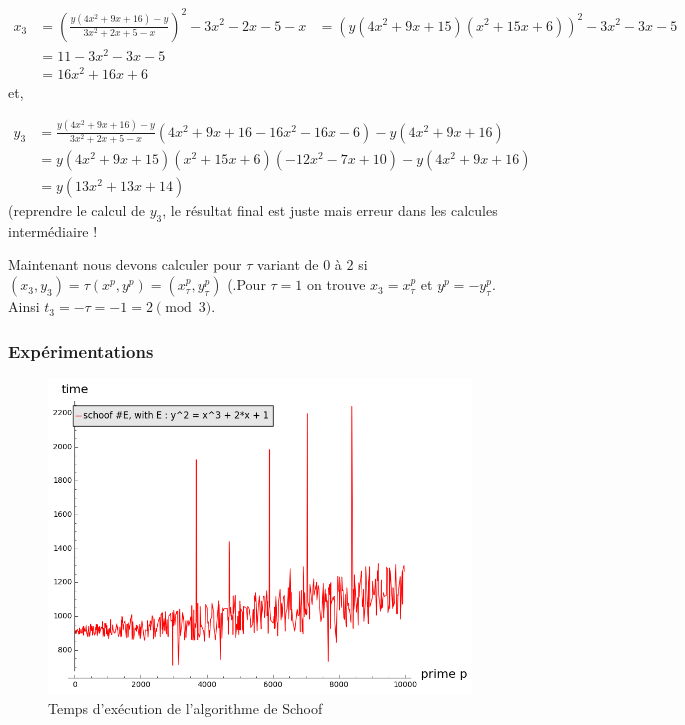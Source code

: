 \documentclass{article}
\begin{document}
\begin{align*}
x_3 &= (\frac{y(4x^2+9x+16) - y}{3x^2 +2x +5 - x})^2 -3x^2 -2x - 5 - x 
 	&= (y(4x^2+9x+15)(x^2+15x+6))^2 -3x^2 -3x - 5 \\
 	&= 11 - 3x^2 -3x - 5  \\
 	&= 16x^2 + 16x + 6 
\end{align*}
et, 

\begin{align*}
y_3 &= \frac{y(4x^2+9x+16) - y}{3x^2 +2x +5 - x} (4x^2+9x+16 -  16x^2 - 16x - 6) - y(4x^2+9x+16) \\
	&= y(4x^2+9x+15)(x^2+15x+6)( -12x^2 - 7x +10 ) - y(4x^2+9x+16)\\
	&= y(13x^2 + 13x + 14)
\end{align*}
(reprendre le calcul de $y_3$, le résultat final est juste mais erreur dans les calcules intermédiaire !

Maintenant nous devons calculer pour $\tau$ variant de $0$ à $2$ si $(x_3, y_3) = \tau (x^p, y^p)=(x_{\tau}^p, y_{\tau}^p)$  (.Pour $\tau = 1$ on trouve $x_3 = x_{\tau}^p$ et $y^p= - y_{\tau}^p$. Ainsi $t_3 = -\tau = -1 = 2 \pmod 3$. 

\newpage
\subsubsection{Expérimentations}


\begin{figure}[h!]
\includegraphics[scale=0.6]{pictures/schoof_cputime.png} 
\caption{Temps d'exécution de l'algorithme de Schoof}
\end{figure}
\end{document}
